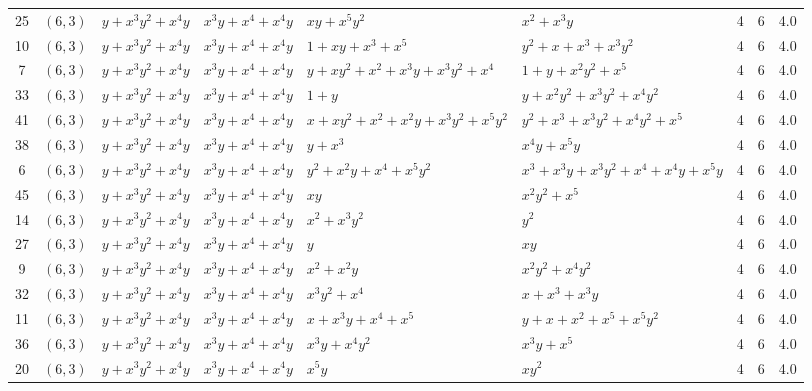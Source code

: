 \begin{table}[t]
\begin{tabular*}{\textwidth}{@{\extracolsep{\fill}}cllllllcc}
25 & $(6,3)$ & $y{+}x^{3}y^{2}{+}x^{4}y$ & $x^{3}y{+}x^{4}{+}x^{4}y$ & $xy{+}x^{5}y^{2}$ & $x^{2}{+}x^{3}y$ & 4 & 6 & 4.0 \\
10 & $(6,3)$ & $y{+}x^{3}y^{2}{+}x^{4}y$ & $x^{3}y{+}x^{4}{+}x^{4}y$ & $1{+}xy{+}x^{3}{+}x^{5}$ & $y^{2}{+}x{+}x^{3}{+}x^{3}y^{2}$ & 4 & 6 & 4.0 \\
7 & $(6,3)$ & $y{+}x^{3}y^{2}{+}x^{4}y$ & $x^{3}y{+}x^{4}{+}x^{4}y$ & $y{+}xy^{2}{+}x^{2}{+}x^{3}y{+}x^{3}y^{2}{+}x^{4}$ & $1{+}y{+}x^{2}y^{2}{+}x^{5}$ & 4 & 6 & 4.0 \\
33 & $(6,3)$ & $y{+}x^{3}y^{2}{+}x^{4}y$ & $x^{3}y{+}x^{4}{+}x^{4}y$ & $1{+}y$ & $y{+}x^{2}y^{2}{+}x^{3}y^{2}{+}x^{4}y^{2}$ & 4 & 6 & 4.0 \\
41 & $(6,3)$ & $y{+}x^{3}y^{2}{+}x^{4}y$ & $x^{3}y{+}x^{4}{+}x^{4}y$ & $x{+}xy^{2}{+}x^{2}{+}x^{2}y{+}x^{3}y^{2}{+}x^{5}y^{2}$ & $y^{2}{+}x^{3}{+}x^{3}y^{2}{+}x^{4}y^{2}{+}x^{5}$ & 4 & 6 & 4.0 \\
38 & $(6,3)$ & $y{+}x^{3}y^{2}{+}x^{4}y$ & $x^{3}y{+}x^{4}{+}x^{4}y$ & $y{+}x^{3}$ & $x^{4}y{+}x^{5}y$ & 4 & 6 & 4.0 \\
6 & $(6,3)$ & $y{+}x^{3}y^{2}{+}x^{4}y$ & $x^{3}y{+}x^{4}{+}x^{4}y$ & $y^{2}{+}x^{2}y{+}x^{4}{+}x^{5}y^{2}$ & $x^{3}{+}x^{3}y{+}x^{3}y^{2}{+}x^{4}{+}x^{4}y{+}x^{5}y$ & 4 & 6 & 4.0 \\
45 & $(6,3)$ & $y{+}x^{3}y^{2}{+}x^{4}y$ & $x^{3}y{+}x^{4}{+}x^{4}y$ & $xy$ & $x^{2}y^{2}{+}x^{5}$ & 4 & 6 & 4.0 \\
14 & $(6,3)$ & $y{+}x^{3}y^{2}{+}x^{4}y$ & $x^{3}y{+}x^{4}{+}x^{4}y$ & $x^{2}{+}x^{3}y^{2}$ & $y^{2}$ & 4 & 6 & 4.0 \\
27 & $(6,3)$ & $y{+}x^{3}y^{2}{+}x^{4}y$ & $x^{3}y{+}x^{4}{+}x^{4}y$ & $y$ & $xy$ & 4 & 6 & 4.0 \\
9 & $(6,3)$ & $y{+}x^{3}y^{2}{+}x^{4}y$ & $x^{3}y{+}x^{4}{+}x^{4}y$ & $x^{2}{+}x^{2}y$ & $x^{2}y^{2}{+}x^{4}y^{2}$ & 4 & 6 & 4.0 \\
32 & $(6,3)$ & $y{+}x^{3}y^{2}{+}x^{4}y$ & $x^{3}y{+}x^{4}{+}x^{4}y$ & $x^{3}y^{2}{+}x^{4}$ & $x{+}x^{3}{+}x^{3}y$ & 4 & 6 & 4.0 \\
11 & $(6,3)$ & $y{+}x^{3}y^{2}{+}x^{4}y$ & $x^{3}y{+}x^{4}{+}x^{4}y$ & $x{+}x^{3}y{+}x^{4}{+}x^{5}$ & $y{+}x{+}x^{2}{+}x^{5}{+}x^{5}y^{2}$ & 4 & 6 & 4.0 \\
36 & $(6,3)$ & $y{+}x^{3}y^{2}{+}x^{4}y$ & $x^{3}y{+}x^{4}{+}x^{4}y$ & $x^{3}y{+}x^{4}y^{2}$ & $x^{3}y{+}x^{5}$ & 4 & 6 & 4.0 \\
20 & $(6,3)$ & $y{+}x^{3}y^{2}{+}x^{4}y$ & $x^{3}y{+}x^{4}{+}x^{4}y$ & $x^{5}y$ & $xy^{2}$ & 4 & 6 & 4.0 \\

\end{tabular*}
\end{table}
